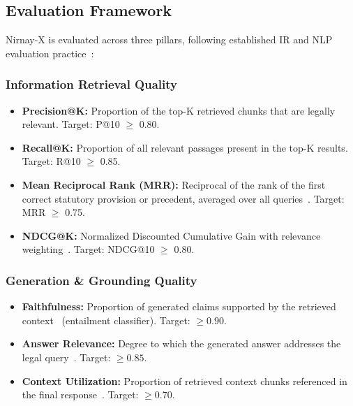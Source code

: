 \documentclass[12pt,a4paper]{article}
\begin{document}
\subsection{Evaluation Framework}

Nirnay-X is evaluated across three pillars, following established IR and NLP
evaluation practice~\cite{manning2008ir, guha2023legalbench}:

\subsubsection{Information Retrieval Quality~\cite{manning2008ir}}

\begin{itemize}[leftmargin=*]
  \item \textbf{Precision@K:} Proportion of the top-K retrieved chunks that are legally
    relevant. Target: P@10 $\geq$ 0.80.
  \item \textbf{Recall@K:} Proportion of all relevant passages present in the top-K
    results. Target: R@10 $\geq$ 0.85.
  \item \textbf{Mean Reciprocal Rank (MRR):} Reciprocal of the rank of the first
    correct statutory provision or precedent, averaged over all queries~\cite{manning2008ir}.
    Target: MRR $\geq$ 0.75.
  \item \textbf{NDCG@K:} Normalized Discounted Cumulative Gain with relevance
    weighting~\cite{manning2008ir}. Target: NDCG@10 $\geq$ 0.80.
\end{itemize}

\subsubsection{Generation \& Grounding Quality}

\begin{itemize}[leftmargin=*]
  \item \textbf{Faithfulness:} Proportion of generated claims supported by the
    retrieved context~\cite{lewis2020rag} (entailment classifier). Target: $\geq 0.90$.
  \item \textbf{Answer Relevance:} Degree to which the generated answer addresses the
    legal query~\cite{guha2023legalbench}. Target: $\geq 0.85$.
  \item \textbf{Context Utilization:} Proportion of retrieved context chunks
    referenced in the final response~\cite{lewis2020rag}. Target: $\geq 0.70$.
\end{itemize}
\end{document}
